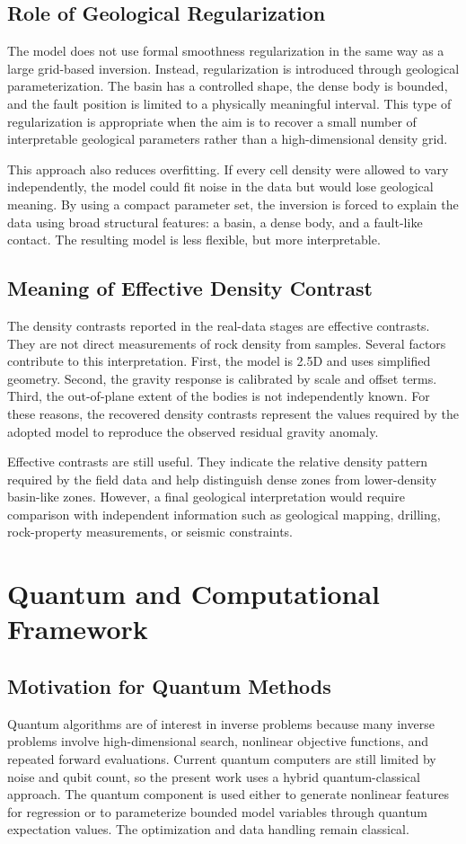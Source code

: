 \documentclass[12pt,a4paper]{article}
\begin{document}
\subsection{Role of Geological Regularization}
The model does not use formal smoothness regularization in the same way as a large grid-based inversion. Instead, regularization is introduced through geological parameterization. The basin has a controlled shape, the dense body is bounded, and the fault position is limited to a physically meaningful interval. This type of regularization is appropriate when the aim is to recover a small number of interpretable geological parameters rather than a high-dimensional density grid.

This approach also reduces overfitting. If every cell density were allowed to vary independently, the model could fit noise in the data but would lose geological meaning. By using a compact parameter set, the inversion is forced to explain the data using broad structural features: a basin, a dense body, and a fault-like contact. The resulting model is less flexible, but more interpretable.

\subsection{Meaning of Effective Density Contrast}
The density contrasts reported in the real-data stages are effective contrasts. They are not direct measurements of rock density from samples. Several factors contribute to this interpretation. First, the model is 2.5D and uses simplified geometry. Second, the gravity response is calibrated by scale and offset terms. Third, the out-of-plane extent of the bodies is not independently known. For these reasons, the recovered density contrasts represent the values required by the adopted model to reproduce the observed residual gravity anomaly.

Effective contrasts are still useful. They indicate the relative density pattern required by the field data and help distinguish dense zones from lower-density basin-like zones. However, a final geological interpretation would require comparison with independent information such as geological mapping, drilling, rock-property measurements, or seismic constraints.

\clearpage
\section{Quantum and Computational Framework}
\subsection{Motivation for Quantum Methods}
Quantum algorithms are of interest in inverse problems because many inverse problems involve high-dimensional search, nonlinear objective functions, and repeated forward evaluations. Current quantum computers are still limited by noise and qubit count, so the present work uses a hybrid quantum-classical approach. The quantum component is used either to generate nonlinear features for regression or to parameterize bounded model variables through quantum expectation values. The optimization and data handling remain classical.
\end{document}
